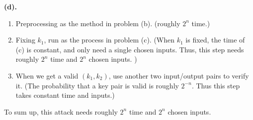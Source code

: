 \documentclass[a4paper]{article}
\newenvironment{problem}[2][Problem]{\begin{trivlist}
\item[\hskip \labelsep {\bfseries #1}\hskip \labelsep {\bfseries #2.}]}{\end{trivlist}}
\begin{document}
\begin{problem}{6.13}
\textbf{(d).}\par
\begin{enumerate}
    \item Preprocessing as the method in problem (b). (roughly $2^n$ time.)
    \item Fixing $k_1$, run as the process in problem (c). 
    (When $k_1$ is fixed, the time of (c) is constant, and only need a single chosen inputs. Thus, this step needs roughly $2^n$ time and $2^n$ chosen inputs. )
    \item When we get a valid $(k_1,k_2)$, use another two input/output pairs to verify it. (The probability that a key pair is valid is roughly $2^{-n}$. Thus this step takes constant time and inputs.)
\end{enumerate}
To sum up, this attack needs roughly $2^n$ time and $2^n$ chosen inputs.
\par\vspace{3ex}
\end{problem}
\end{document}
